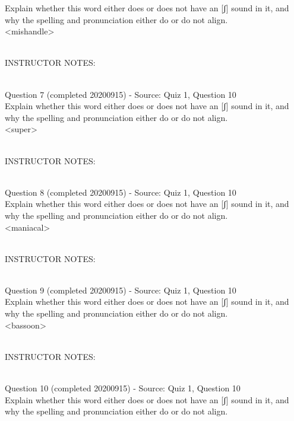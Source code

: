 \documentclass[12pt]{article}
\begin{document}
Explain whether this word either does or does not have an [ʃ] sound in it, and why the spelling and pronunciation either do or do not align.\\

<mishandle>


~\\
INSTRUCTOR NOTES: 


~\\

{\large Question 7} (completed 20200915) - Source: Quiz 1, Question 10\\

Explain whether this word either does or does not have an [ʃ] sound in it, and why the spelling and pronunciation either do or do not align.\\

<super>


~\\
INSTRUCTOR NOTES: 


~\\

{\large Question 8} (completed 20200915) - Source: Quiz 1, Question 10\\

Explain whether this word either does or does not have an [ʃ] sound in it, and why the spelling and pronunciation either do or do not align.\\

<maniacal>


~\\
INSTRUCTOR NOTES: 


~\\

{\large Question 9} (completed 20200915) - Source: Quiz 1, Question 10\\

Explain whether this word either does or does not have an [ʃ] sound in it, and why the spelling and pronunciation either do or do not align.\\

<bassoon>


~\\
INSTRUCTOR NOTES: 


~\\

{\large Question 10} (completed 20200915) - Source: Quiz 1, Question 10\\

Explain whether this word either does or does not have an [ʃ] sound in it, and why the spelling and pronunciation either do or do not align.\\
\end{document}
